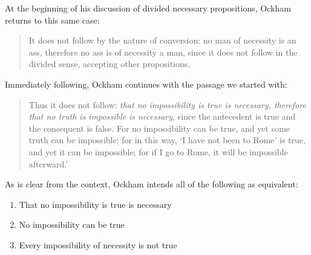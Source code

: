 \documentclass[a4paper]{article}
\begin{document}
At the beginning of his discussion of divided necessary propositions, Ockham returns to this same case:

\begin{quote}
It does not follow by the nature of conversion: no man of necessity is an ass, therefore no ass is of necessity a man, since it does not follow in the divided sense, accepting other propositions. \cite[II. 24, p. 297]{OckhamSL2}
\end{quote}

Immediately following, Ockham continues with the passage we started with:
\begin{quote}
Thus it does not follow: \textit{that no impossibility is true is necessary, therefore that no truth is impossible is necessary}, since the antecedent is true and the consequent is false. For no impossibility can be true, and yet some truth can be impossible; for in this way, `I have not been to Rome' is true, and yet it can be impossible; for if I go to Rome, it will be impossible afterward.' \cite[II. 24, pp. 297-298]{OckhamSL2}
\end{quote}

As is clear from the context, Ockham intends all of the following as equivalent: 
\begin{enumerate}
\item That no impossibility is true is necessary

\item No impossibility can be true

\item Every impossibility of necessity is not true
\end{enumerate}
\end{document}
